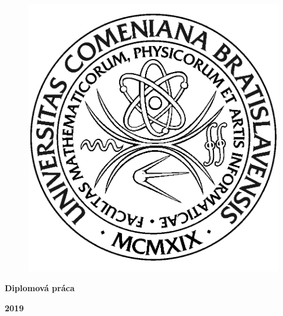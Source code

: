 \begin{center}
\centerline{\LARGE\sc\textbf\skola}
\sc\LARGE\textbf\fakulta
\end{center}

\vspace*{3cm}

\begin{figure}[!hbt]
	\begin{center}
		\includegraphics{img/logo_fmph}
		\label{img:logo}
	\end{center}
\end{figure}

\begin{center}
\begin{minipage}{0.8\textwidth}
\begin{center}
 \LARGE\sc\textbf\nazov
 \vspace{1em}
 \centerline{\Large\bf Diplomová práca}
\end{center}
\end{minipage}
\end{center}

\vfill
\noindent
 {\bf 2019}  \hfill {\bf \autor}
\thispagestyle{empty}



